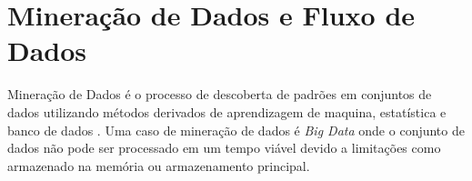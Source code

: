 \section{Mineração de Dados e Fluxo de Dados}


Mineração de Dados é o processo de descoberta de padrões em conjuntos de dados
utilizando métodos derivados de aprendizagem de maquina, estatística e banco de
dados \cite{Gaber2005}. Uma caso de mineração de dados é \emph{Big Data} onde o
conjunto de dados não pode ser processado em um tempo viável devido a limitações
como armazenado na memória ou armazenamento principal.

% 
% 


% 

